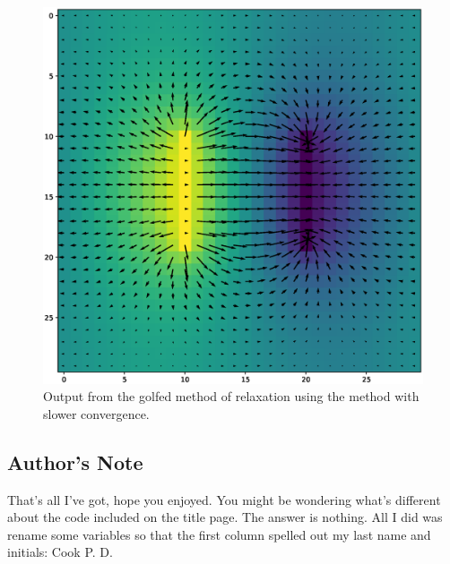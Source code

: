 \documentclass[12pt,twocolumn]{article}
\begin{document}
\begin{figure}
\includegraphics[width=\linewidth]{SlowGolf.eps}
\caption{Output from the golfed method of relaxation using the method with slower convergence.}
\label{fig:slowgolf}
\end{figure}

\subsection{Author's Note}
That's all I've got, hope you enjoyed. You might be wondering what's different about the code included on the title page. The answer is nothing. All I did was rename some variables so that the first column spelled out my last name and initials: Cook P. D.



\onecolumn
\appendix
\end{document}
